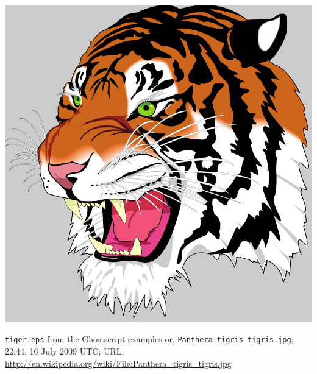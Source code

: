 \documentclass{jsarticle}
\begin{document}
\includegraphics[width=15cm]{tiger.pdf}

\verb|tiger.eps| from the Ghostscript examples or,
\verb|Panthera tigris tigris.jpg|; 22:44, 16 July 2009 UTC; URL: \url{http://en.wikipedia.org/wiki/File:Panthera_tigris_tigris.jpg}
\end{document}
